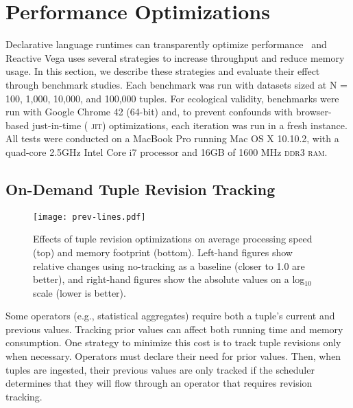 \vspace{-20pt}

\section{Performance Optimizations}
\label{sec:vg:optimizations}

\vspace{-10pt}

Declarative language runtimes can transparently optimize
performance~\cite{heer:protovisjava} and Reactive Vega uses several strategies
to increase throughput and reduce memory usage. In this section, we describe
these strategies and evaluate their effect through benchmark studies. Each
benchmark was run with datasets sized at N = 100, 1,000, 10,000, and 100,000
tuples. For ecological validity, benchmarks were run with Google Chrome 42
(64-bit) and, to prevent confounds with browser-based just-in-time (
\textsc{jit}) optimizations, each iteration was run in a fresh instance. All
tests were conducted on a MacBook Pro running Mac OS X 10.10.2, with a quad-core
2.5GHz Intel Core i7 processor and 16GB of 1600 MHz \textsc{ddr3 ram}.

\vspace{-10pt}

\subsection{On-Demand Tuple Revision Tracking}

\vspace{-7pt}

\begin{figure}[h!]
  \centering
  \texttt{[image: prev-lines.pdf]}
  \caption{Effects of tuple revision optimizations on average
processing speed (top) and memory footprint (bottom). Left-hand figures show
relative changes using no-tracking as a baseline (closer to 1.0 are better),
and right-hand figures show the absolute values on a log$_{10}$ scale
(lower is better).}
  \label{fig:vg:prev_benchmark}
\end{figure}

Some operators (e.g., statistical aggregates) require both a tuple's current and
previous values. Tracking prior values can affect both running time and memory
consumption. One strategy to minimize this cost is to track tuple revisions only
when necessary. Operators must declare their need for prior values. Then, when
tuples are ingested, their previous values are only tracked if the scheduler
determines that they will flow through an operator that requires revision
tracking.

